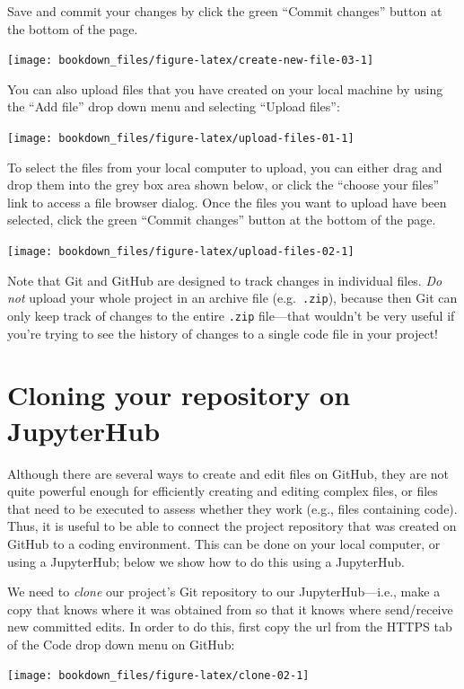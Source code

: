 \documentclass[
]{krantz}
\begin{document}
Save and commit your changes by click the green ``Commit changes'' button at the
bottom of the page.

\texttt{[image: bookdown\_files/figure-latex/create-new-file-03-1]}

You can also upload files that you have created on your local machine by using
the ``Add file'' drop down menu and selecting ``Upload files'':

\texttt{[image: bookdown\_files/figure-latex/upload-files-01-1]}

To select the files from your local computer to upload, you can either drag and
drop them into the grey box area shown below, or click the ``choose your files''
link to access a file browser dialog. Once the files you want to upload have
been selected, click the green ``Commit changes'' button at the bottom of the
page.

\texttt{[image: bookdown\_files/figure-latex/upload-files-02-1]}

Note that Git and GitHub are designed to track changes in individual files. \emph{Do not}
upload your whole project in an archive file (e.g.~\texttt{.zip}), because
then Git can only keep track of changes to the entire \texttt{.zip} file---that wouldn't be very useful
if you're trying to see the history of changes to a single code file in your project!

\hypertarget{cloning-your-repository-on-jupyterhub}{%
\section{Cloning your repository on JupyterHub}\label{cloning-your-repository-on-jupyterhub}}

Although there are several ways to create and edit files on
GitHub, they are not quite powerful enough for
efficiently creating and editing complex files, or files that need to be
executed to assess whether they work (e.g., files containing code). Thus, it is
useful to be able to connect the project repository that was created on
GitHub to a coding environment. This can be done on
your local computer, or using a JupyterHub; below we show how to do this using a JupyterHub.

We need to \emph{clone} our project's Git repository to our JupyterHub---i.e., make a copy that knows where it was obtained from so that it knows where
send/receive new committed edits. In order to do this, first copy the url from the HTTPS tab of the Code drop down menu on
GitHub:

\texttt{[image: bookdown\_files/figure-latex/clone-02-1]}
\end{document}
